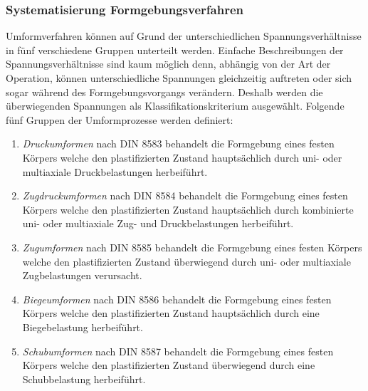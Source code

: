 \documentclass[12pt,a4paper,parskip]{scrartcl}
\begin{document}
{\subsubsection{Systematisierung Formgebungsverfahren}
Umformverfahren können
auf Grund der unterschiedlichen Spannungsverhältnisse in fünf verschiedene Gruppen unterteilt werden. Einfache Beschreibungen der Spannungsverhältnisse sind kaum möglich denn,  abhängig von der Art der Operation, können  unterschiedliche Spannungen gleichzeitig auftreten oder sich sogar  während des Formgebungsvorgangs verändern. Deshalb werden die überwiegenden Spannungen als Klassifikationskriterium ausgewählt. Folgende fünf Gruppen der Umformprozesse werden definiert:
\begin{enumerate}
\item \emph{Druckumformen} nach DIN 8583 behandelt die Formgebung eines festen Körpers  welche den  plastifizierten  Zustand hauptsächlich durch uni- oder multiaxiale Druckbelastungen herbeiführt.
\item \emph{Zugdruckumformen} nach DIN 8584 behandelt die Formgebung eines festen Körpers  welche den plastifizierten Zustand  hauptsächlich durch kombinierte uni- oder multiaxiale Zug- und Druckbelastungen herbeiführt.
\item \emph{Zugumformen} nach DIN 8585 behandelt die Formgebung eines festen Körpers welche den plastifizierten Zustand überwiegend durch uni- oder multiaxiale Zugbelastungen verursacht.
\item \emph{Biegeumformen} nach DIN 8586 behandelt die Formgebung eines festen Körpers welche den plastifizierten Zustand hauptsächlich durch eine Biegebelastung herbeiführt.
\item \emph{Schubumformen} nach DIN 8587 behandelt die Formgebung eines festen Körpers welche den plastifizierten Zustand überwiegend durch eine Schubbelastung herbeiführt.

\end{enumerate}

}
\end{document}
